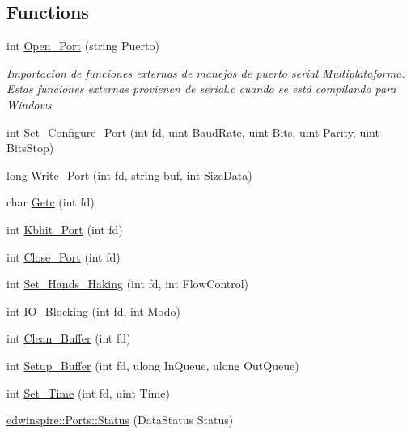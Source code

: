 \subsection*{Functions}
\begin{DoxyCompactItemize}
\item 
int \hyperlink{libspire__serial_8vala_a5257285d61e52d4f38f5b9426643f8e2}{Open\-\_\-\-Port} (string Puerto)
\begin{DoxyCompactList}\small\item\em Importacion de funciones externas de manejos de puerto serial Multiplataforma. Estas funciones externas provienen de serial.\-c cuando se está compilando para Windows \end{DoxyCompactList}\item 
int \hyperlink{libspire__serial_8vala_a358f02cfc4dfa7d4c59442be87dcd127}{Set\-\_\-\-Configure\-\_\-\-Port} (int fd, uint Baud\-Rate, uint Bits, uint Parity, uint Bits\-Stop)
\item 
long \hyperlink{libspire__serial_8vala_a438b86765617ff401ee9ac70cd936fbc}{Write\-\_\-\-Port} (int fd, string buf, int Size\-Data)
\item 
char \hyperlink{libspire__serial_8vala_aa54c19e3adbf144d3cb693d776b646c0}{Getc} (int fd)
\item 
int \hyperlink{libspire__serial_8vala_a7e22103cbfa46effeac36fcbbdd752f6}{Kbhit\-\_\-\-Port} (int fd)
\item 
int \hyperlink{libspire__serial_8vala_ab43253c738acffc6d6fc7176ee1aacb6}{Close\-\_\-\-Port} (int fd)
\item 
int \hyperlink{libspire__serial_8vala_a215c51266ce081fa46cb9c1f2f395d0f}{Set\-\_\-\-Hands\-\_\-\-Haking} (int fd, int Flow\-Control)
\item 
int \hyperlink{libspire__serial_8vala_a4d56f13b087367e5ade87176e96285fc}{I\-O\-\_\-\-Blocking} (int fd, int Modo)
\item 
int \hyperlink{libspire__serial_8vala_a740e10aea09874bdeb3c4641aeceb891}{Clean\-\_\-\-Buffer} (int fd)
\item 
int \hyperlink{libspire__serial_8vala_af737482681e97ca6ed05e31f452b7857}{Setup\-\_\-\-Buffer} (int fd, ulong In\-Queue, ulong Out\-Queue)
\item 
int \hyperlink{libspire__serial_8vala_a70231811c32b2be3c76d5e9789c0f608}{Set\-\_\-\-Time} (int fd, uint Time)
\item 
\hyperlink{namespaceedwinspire_1_1_ports_a10704194579fb04d8727a79a98d53f3f}{edwinspire\-::\-Ports\-::\-Status} (Data\-Status Status)
\item 

\end{DoxyCompactItemize}
